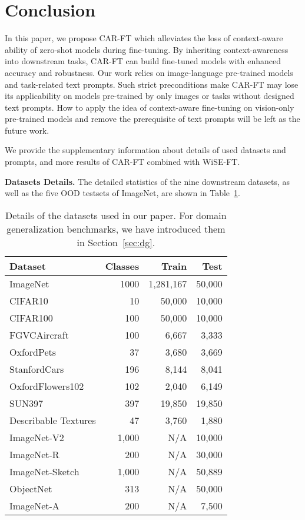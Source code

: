 \documentclass[pdflatex,sn-basic,iicol]{sn-jnl}
\theoremstyle{thmstyleone}\newtheorem{theorem}{Theorem}\newtheorem{proposition}[theorem]{Proposition}
\theoremstyle{thmstyletwo}\newtheorem{example}{Example}\newtheorem{remark}{Remark}
\theoremstyle{thmstylethree}\newtheorem{definition}{Definition}
\begin{document}
\section{Conclusion}

In this paper, we propose CAR-FT which alleviates the loss of context-aware ability of zero-shot models during fine-tuning. By inheriting context-awareness into downstream tasks, CAR-FT can build fine-tuned models with enhanced accuracy and robustness. Our work relies on image-language pre-trained models and task-related text prompts. Such strict preconditions make CAR-FT may lose its applicability on models pre-trained by only images or tasks without designed text prompts. How to apply the idea of context-aware fine-tuning on vision-only pre-trained models and remove the prerequisite of text prompts will be left as the future work.



\backmatter


We provide the supplementary information about details of used datasets and prompts, and more results of CAR-FT combined with WiSE-FT.

\noindent\textbf{Datasets Details.} The detailed statistics of the nine downstream datasets, as well as the
five OOD testsets of ImageNet, are shown in Table~\ref{tab:datasets_details}.

\begin{table}[t]\footnotesize
\begin{center}
\caption{Details of the datasets used in our paper. For domain generalization benchmarks, we have introduced them in Section~\ref{sec:dg}.} \label{tab:datasets_details}
\begin{tabular}{lrrr}
\toprule
Dataset & Classes & Train & Test \\
\midrule
ImageNet & 1000 & 1,281,167 & 50,000 \\
CIFAR10 & 10 & 50,000 & 10,000 \\
CIFAR100 & 100 & 50,000 & 10,000 \\
FGVCAircraft & 100 & 6,667 & 3,333 \\
OxfordPets & 37 & 3,680 & 3,669 \\
StanfordCars & 196 & 8,144 & 8,041 \\
OxfordFlowers102 & 102 & 2,040 & 6,149 \\
SUN397 & 397 & 19,850 & 19,850 \\
Describable Textures & 47 & 3,760 & 1,880 \\
\midrule
ImageNet-V2 & 1,000 & N/A & 10,000 \\
ImageNet-R & 200 & N/A & 30,000 \\
ImageNet-Sketch & 1,000 & N/A & 50,889 \\
ObjectNet & 313 & N/A & 50,000 \\
ImageNet-A & 200 & N/A & 7,500 \\
\bottomrule
\end{tabular}
\end{center}
\end{table}
\end{document}
